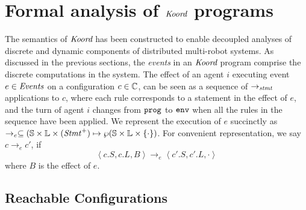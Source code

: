 \section{Formal analysis of $\emph{Koord}$ programs}
\label{sec:verification}
The semantics of $\emph{Koord}$ has been constructed to enable decoupled analyses of discrete and dynamic components of distributed multi-robot systems. As discussed in the previous sections, the \emph{events} in an $\emph{Koord}$ program comprise the discrete computations in the system. The effect of an agent $i$ executing event $e\in \mathit{Events}$ on a configuration $c\in \mathbb{C}$, can be seen as a sequence of $\rightarrow_\mathit{stmt}$ applications to $c$, where each rule corresponds to a statement in the effect of $e$, and the turn of agent $i$ changes from $\mathtt{prog}$ to $\mathtt{env}$ when all the rules in the sequence have been applied. We represent the execution of $e$ succinctly as $\rightarrow_e \subseteq (\mathbb{S} \times \mathbb{L}\times (\mathit{Stmt}^+) \mapsto \wp(\mathbb{S}\times \mathbb{L} \times \{\cdot\} )$. For convenient representation, we say $c \rightarrow_e c'$, if $$ \left \langle c.S, c.L, B \right\rangle \rightarrow_e \left\langle c'.S, c'.L, \cdot \right\rangle$$ where $B$ is the effect of $e$.

\subsection{Reachable Configurations}

